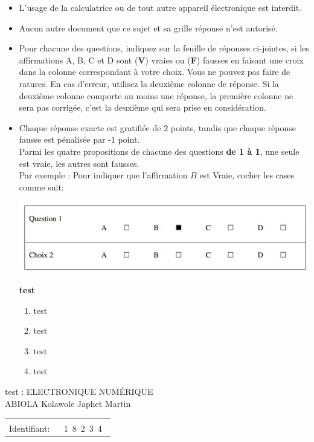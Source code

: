 \documentclass{book}%
\begin{document}
\begin{itemize}%
\item%
L'usage de la calculatrice ou de tout autre appareil électronique est interdit.%
\item%
Aucun autre document que ce sujet et sa grille réponse n'est autorisé.%
\item%
Pour chacune des questions, indiquez sur la feuille de réponses ci-jointes, si les affirmations A, B, C et D sont (\textbf{V}) vraies ou (\textbf{F}) fausses en faisant une croix dans la colonne correspondant à votre choix. Vous ne pouvez pas faire de ratures. En cas d'erreur, utilisez la deuxième colonne de réponse. Si la deuxième colonne comporte au moins une réponse, la première colonne ne sera pas corrigée, c'est la deuxième qui sera prise en considération.%
\item%
Chaque réponse exacte est gratifiée de 2 points, tandis que chaque réponse fausse est pénalisée par -1 point. \\ 	Parmi les quatre propositions de chacune des questions \textbf{de 1 à 1}, une seule est vraie, les autres sont fausses. \\ 	Par exemple : Pour indiquer que l'affirmation $B$ est Vraie, cocher les cases comme suit:  \\ \begin{center}	\includegraphics[scale=0.8]{reponses.png} \end{center}%
\thispagestyle{empty}%
\begin{exercise}%
\textbf{test }%
\begin{enumerate}[label=\textbf{\Alph*. }]%
\item%
test%
\item%
test%
\item%
test%
\item%
test%
\end{enumerate}%
\end{exercise}%
\end{itemize}%
\newpage%
\thispagestyle{empty}%
test : ELECTRONIQUE NUMÉRIQUE $\qquad \qquad \qquad \qquad \qquad \qquad \qquad \qquad$ ABIOLA Kolawole Japhet Martin%
\begin{flushright}%
\begin{tabular}{|l|}%
\hline%
 \\%
\thispagestyle{empty}%
Identifiant: $\quad$ {\Large 1~8~2~3~4~}%
 \\%
\hline%
\end{tabular}%
\end{flushright}%
\end{document}
